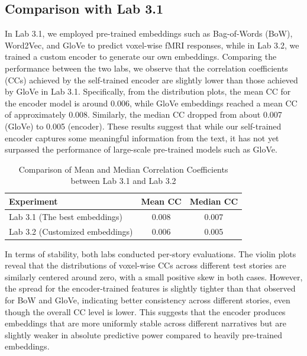 \documentclass[11pt,letterpaper]{article}
\begin{document}
\vspace{1em} %
\subsection{Comparison with Lab 3.1}
\vspace{0.5em} %
In Lab 3.1, we employed pre-trained embeddings such as Bag-of-Words (BoW), Word2Vec, and GloVe to predict voxel-wise fMRI responses, while in Lab 3.2, we trained a custom encoder to generate our own embeddings. Comparing the performance between the two labs, we observe that the correlation coefficients (CCs) achieved by the self-trained encoder are slightly lower than those achieved by GloVe in Lab 3.1. Specifically, from the distribution plots, the mean CC for the encoder model is around 0.006, while GloVe embeddings reached a mean CC of approximately 0.008. Similarly, the median CC dropped from about 0.007 (GloVe) to 0.005 (encoder). These results suggest that while our self-trained encoder captures some meaningful information from the text, it has not yet surpassed the performance of large-scale pre-trained models such as GloVe.

\begin{table}[H]
\centering
\begin{tabular}{lcc}
\hline
\textbf{Experiment} & \textbf{Mean CC} & \textbf{Median CC} \\
\hline
Lab 3.1 (The best embeddings) & 0.008 & 0.007 \\
Lab 3.2 (Customized embeddings) & 0.006 & 0.005 \\
\hline
\end{tabular}
\caption{Comparison of Mean and Median Correlation Coefficients between Lab 3.1 and Lab 3.2 }
\label{tab:cc_comparison}
\end{table}

In terms of stability, both labs conducted per-story evaluations. The violin plots reveal that the distributions of voxel-wise CCs across different test stories are similarly centered around zero, with a small positive skew in both cases. However, the spread for the encoder-trained features is slightly tighter than that observed for BoW and GloVe, indicating better consistency across different stories, even though the overall CC level is lower. This suggests that the encoder produces embeddings that are more uniformly stable across different narratives but are slightly weaker in absolute predictive power compared to heavily pre-trained embeddings.
\end{document}
